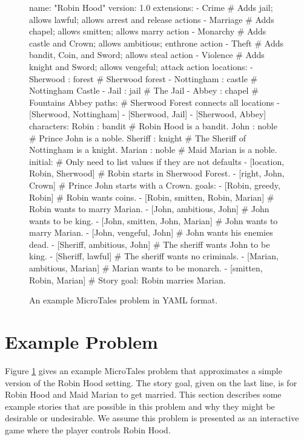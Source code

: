 \documentclass{nilreport}
\begin{document}
\newpage

\begin{figure}[!ht]
{\small
\begin{code}
name: "Robin Hood"
version: 1.0
extensions:
- Crime    # Adds jail; allows lawful; allows arrest and release actions
- Marriage # Adds chapel; allows smitten; allows marry action
- Monarchy # Adds castle and Crown; allows ambitious; enthrone action
- Theft    # Adds bandit, Coin, and Sword; allows steal action
- Violence # Adds knight and Sword; allows vengeful; attack action
locations:
- Sherwood : forest   # Sherwood forest
- Nottingham : castle # Nottingham Castle
- Jail : jail         # The Jail
- Abbey : chapel      # Fountains Abbey
paths: # Sherwood Forest connects all locations
- [Sherwood, Nottingham]
- [Sherwood, Jail]
- [Sherwood, Abbey]
characters:
  Robin : bandit   # Robin Hood is a bandit.
  John : noble     # Prince John is a noble.
  Sheriff : knight # The Sheriff of Nottingham is a knight.
  Marian : noble   # Maid Marian is a noble.
initial: # Only need to list values if they are not defaults
- [location, Robin, Sherwood] # Robin starts in Sherwood Forest.
- [right, John, Crown]        # Prince John starts with a Crown.
goals:
- [Robin, greedy, Robin]           # Robin wants coins.
- [Robin, smitten, Robin, Marian]  # Robin wants to marry Marian.
- [John, ambitious, John]          # John wants to be king.
- [John, smitten, John, Marian]    # John wants to marry Marian.
- [John, vengeful, John]           # John wants his enemies dead.
- [Sheriff, ambitious, John]       # The sheriff wants John to be king.
- [Sheriff, lawful]                # The sheriff wants no criminals.
- [Marian, ambitious, Marian]      # Marian wants to be monarch.
- [smitten, Robin, Marian]         # Story goal: Robin marries Marian.
\end{code}}
\vspace{-1em}
\caption{An example MicroTales problem in YAML format.}
\label{fig:problemex}
\end{figure}

\section{Example Problem}

Figure \ref{fig:problemex} gives an example MicroTales problem that approximates a simple version of the Robin Hood setting. The story goal, given on the last line, is for Robin Hood and Maid Marian to get married. This section describes some example stories that are possible in this problem and why they might be desirable or undesirable. We assume this problem is presented as an interactive game where the player controls Robin Hood.
\end{document}
